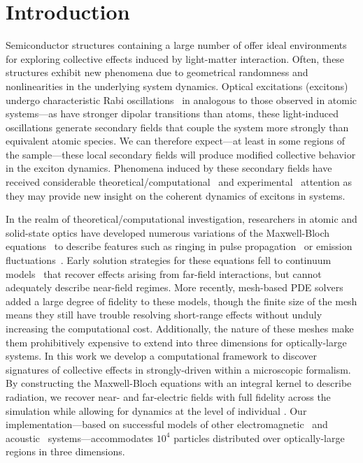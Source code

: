 \section{\label{section:introduction}Introduction}

Semiconductor structures containing a large number of \qds{} offer ideal environments for exploring collective effects induced by light-matter interaction.
Often, these structures exhibit new phenomena due to geometrical randomness and nonlinearities in the underlying system dynamics.
Optical excitations (excitons) undergo characteristic Rabi oscillations~\cite{Stievater2001,Kamada2001,Htoon2002} in \qds{} analogous to those observed in atomic systems---as \qds{} have stronger dipolar transitions than atoms, these light-induced oscillations generate secondary fields that couple the system more strongly than equivalent atomic species.
We can therefore expect---at least in some regions of the sample---these local secondary fields will produce modified collective behavior in the exciton dynamics.
Phenomena induced by these secondary fields have received considerable theoretical/computational~\cite{Slepyan2002,Slepyan2004} and experimental~\cite{Asakura2013} attention as they may provide new insight on the coherent dynamics of excitons in \qd{} systems.

In the realm of theoretical/computational investigation, researchers in atomic and solid-state optics have developed numerous variations of the Maxwell-Bloch equations~\cite{Gross1982} to describe features such as ringing in pulse propagation~\cite{Burnham1969,MacGillivray1976} or emission fluctuations~\cite{Haake1979}.
Early solution strategies for these equations fell to continuum models~\cite{Rehler1971,MacGillivray1976} that recover effects arising from far-field interactions, but cannot adequately describe near-field regimes.
More recently, mesh-based PDE solvers~\cite{Vanneste2001,Fratalocchi2008,Bachelard2015} added a large degree of fidelity to these models, though the finite size of the mesh means they still have trouble resolving short-range effects without unduly increasing the computational cost.
Additionally, the nature of these meshes make them prohibitively expensive to extend into three dimensions for optically-large systems.
In this work we develop a computational framework to discover signatures of collective effects in strongly-driven \qds{} within a microscopic formalism.
By constructing the Maxwell-Bloch equations with an integral kernel to describe radiation, we recover near- and far-electric fields with full fidelity across the simulation while allowing for dynamics at the level of individual \qds{}.
Our implementation---based on successful models of other electromagnetic~\textcolor{orange}{\cite{Ergin1999,Shanker2000,Pray2012}} and acoustic~\cite{Ergin1999a,Glosser2016} systems---accommodates $10^4$ particles distributed over optically-large regions in three dimensions.

